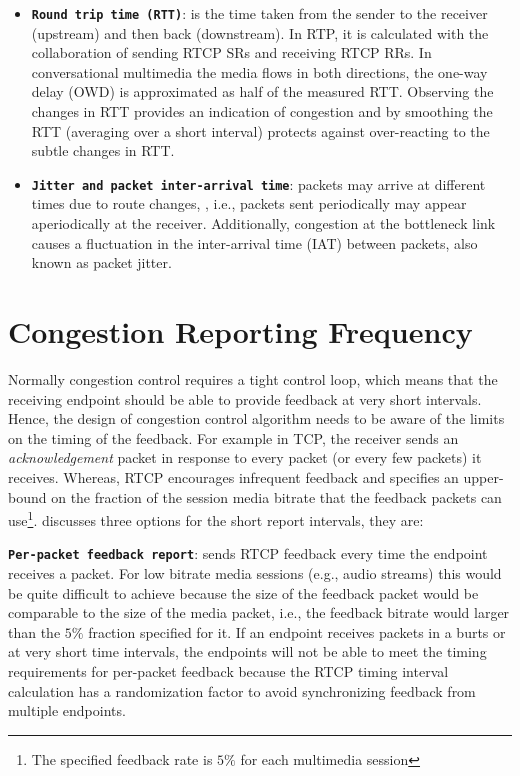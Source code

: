 \begin{itemize}

\item \textbf{\texttt{Round trip time (RTT)}}: is the time taken from the
sender to the receiver (upstream) and then back (downstream). In RTP, it is
calculated with the collaboration of sending RTCP SRs and receiving RTCP RRs.
In conversational multimedia the media flows in both directions, the one-way
delay (OWD) is approximated as half of the measured RTT. Observing the changes
in RTT provides an indication of congestion and by smoothing the RTT
(averaging over a short interval) protects against over-reacting to the subtle
changes in RTT.

\item \textbf{\texttt{Jitter and packet inter-arrival time}}: packets may
arrive at different times due to route changes, , i.e., packets sent
periodically may appear aperiodically at the receiver. Additionally,
congestion at the bottleneck link causes a fluctuation in the inter-arrival
time (IAT) between packets, also known as packet jitter.


\end{itemize}


\section{Congestion Reporting Frequency}
\label{fw.freq}

Normally congestion control requires a tight control loop, which means that
the receiving endpoint should be able to provide feedback at very short
intervals. Hence, the design of congestion control algorithm needs to be aware
of the limits on the timing of the feedback.  For example in TCP, the receiver
sends an \emph{acknowledgement} packet in response to every packet (or every
few packets) it receives. Whereas, RTCP encourages infrequent feedback and
specifies an upper-bound on the fraction of the session media bitrate that the
feedback packets can use\footnote{The specified feedback rate is $5\%$ for
each multimedia session}.  \cite{draft.rmcat.feedback} discusses three options
for the short report intervals, they are:

\textbf{\texttt{Per-packet feedback report}}: sends RTCP feedback every time
the endpoint receives a packet. For low bitrate media sessions (e.g., audio
streams) this would be quite difficult to achieve because the size of the
feedback packet would be comparable to the size of the media packet, i.e., the
feedback bitrate would larger than the $5\%$ fraction specified for it. If an
endpoint receives packets in a burts or at very short time intervals, the
endpoints will not be able to meet the timing requirements for per-packet
feedback because the RTCP timing interval calculation has a randomization
factor to avoid synchronizing feedback from multiple endpoints.

